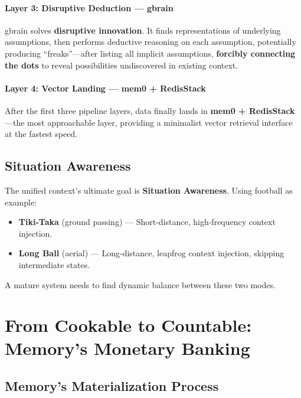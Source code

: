 \documentclass[11pt,a4paper]{article}
\begin{document}
\paragraph{Layer 3: Disruptive Deduction --- gbrain}
gbrain solves \textbf{disruptive innovation}.
It finds representations of underlying assumptions, then performs deductive reasoning on each assumption, potentially producing ``freaks''---after listing all implicit assumptions, \textbf{forcibly connecting the dots} to reveal possibilities undiscovered in existing context.

\paragraph{Layer 4: Vector Landing --- mem0 + RedisStack}
After the first three pipeline layers, data finally lands in \textbf{mem0 + RedisStack}---the most approachable layer, providing a minimalist vector retrieval interface at the fastest speed.

\subsection{Situation Awareness}
\label{sub:situation}

The unified context's ultimate goal is \textbf{Situation Awareness}.
Using football as example:
\begin{itemize}
  \item \textbf{Tiki-Taka} (ground passing) --- Short-distance, high-frequency context injection.
  \item \textbf{Long Ball} (aerial) --- Long-distance, leapfrog context injection, skipping intermediate states.
\end{itemize}

A mature system needs to find dynamic balance between these two modes.

\section{From Cookable to Countable: Memory's Monetary Banking}
\label{sec:monetary}

\subsection{Memory's Materialization Process}
\label{sub:materialization}
\end{document}
